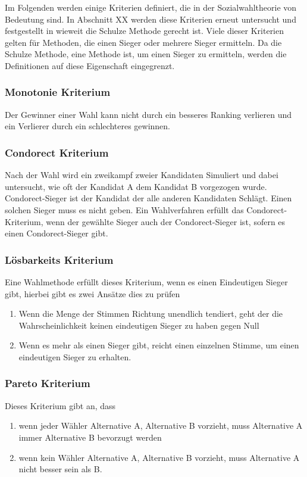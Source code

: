 Im Folgenden werden einige Kriterien definiert, die in der Sozialwahltheorie von Bedeutung sind. In Abschnitt XX werden diese Kriterien erneut untersucht und festgestellt in wieweit die Schulze Methode gerecht ist. Viele dieser Kriterien gelten für Methoden, die einen Sieger oder mehrere Sieger ermitteln. Da die Schulze Methode, eine Methode ist, um einen Sieger zu ermitteln, werden die Definitionen auf diese Eigenschaft eingegrenzt.

\subsubsection{Monotonie Kriterium} 
\label{sec:monotoniekriterium}
Der Gewinner einer Wahl kann nicht durch ein besseres Ranking verlieren und ein Verlierer durch ein schlechteres gewinnen. \cite{Woodall1996}

\subsubsection{Condorect Kriterium} 
\label{sec:condorectKriterium}
Nach der Wahl wird ein zweikampf zweier Kandidaten Simuliert und dabei untersucht, wie oft der Kandidat A dem Kandidat B vorgezogen wurde. Condorect-Sieger ist der Kandidat der alle anderen Kandidaten Schlägt. Einen solchen Sieger muss es nicht geben. Ein Wahlverfahren erfüllt das Condorect-Kriterium, wenn der gewählte Sieger auch der Condorect-Sieger ist, sofern es einen Condorect-Sieger gibt. \cite{Johnson2005}

\subsubsection{Lösbarkeits Kriterium} 
\label{sec:loesbarkeitsKriterium}
Eine Wahlmethode erfüllt dieses Kriterium, wenn es einen Eindeutigen Sieger gibt, hierbei gibt es zwei Ansätze dies zu prüfen \citet{Schulze2017}
\begin{enumerate}
\item Wenn die Menge der Stimmen Richtung unendlich tendiert, geht der die Wahrscheinlichkeit keinen eindeutigen Sieger zu haben gegen Null 
\item Wenn es mehr als einen Sieger gibt, reicht einen einzelnen Stimme, um einen eindeutigen Sieger zu erhalten.
\end{enumerate}

\subsubsection{Pareto Kriterium} 
\label{sec:paretoKriterium}
Dieses Kriterium gibt an, dass
\begin{enumerate}
\item wenn jeder Wähler Alternative A, Alternative B vorzieht, muss Alternative A immer Alternative B bevorzugt werden
\item wenn kein Wähler Alternative A, Alternative B vorzieht, muss Alternative A nicht besser sein als B. \citet{Schulze2017}
\end{enumerate}

